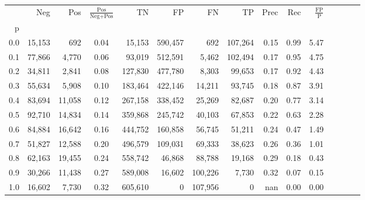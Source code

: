 \begin{tabular}{rrrcrrrrrrrrrrr}
\toprule
{} &     Neg &     Pos & $\frac{\text{Pos}}{\text{Neg}+\text{Pos}}$ &       TN &       FP &       FN &       TP &  Prec &   Rec & $\frac{\text{FP}}{\text{P}}$ \\
p   &         &         &                                            &          &          &          &          &       &       &                              \\
\midrule
0.0 &  15,153 &     692 &                                       0.04 &   15,153 &  590,457 &      692 &  107,264 &  0.15 &  0.99 &                         5.47 \\
0.1 &  77,866 &   4,770 &                                       0.06 &   93,019 &  512,591 &    5,462 &  102,494 &  0.17 &  0.95 &                         4.75 \\
0.2 &  34,811 &   2,841 &                                       0.08 &  127,830 &  477,780 &    8,303 &   99,653 &  0.17 &  0.92 &                         4.43 \\
0.3 &  55,634 &   5,908 &                                       0.10 &  183,464 &  422,146 &   14,211 &   93,745 &  0.18 &  0.87 &                         3.91 \\
0.4 &  83,694 &  11,058 &                                       0.12 &  267,158 &  338,452 &   25,269 &   82,687 &  0.20 &  0.77 &                         3.14 \\
0.5 &  92,710 &  14,834 &                                       0.14 &  359,868 &  245,742 &   40,103 &   67,853 &  0.22 &  0.63 &                         2.28 \\
0.6 &  84,884 &  16,642 &                                       0.16 &  444,752 &  160,858 &   56,745 &   51,211 &  0.24 &  0.47 &                         1.49 \\
0.7 &  51,827 &  12,588 &                                       0.20 &  496,579 &  109,031 &   69,333 &   38,623 &  0.26 &  0.36 &                         1.01 \\
0.8 &  62,163 &  19,455 &                                       0.24 &  558,742 &   46,868 &   88,788 &   19,168 &  0.29 &  0.18 &                         0.43 \\
0.9 &  30,266 &  11,438 &                                       0.27 &  589,008 &   16,602 &  100,226 &    7,730 &  0.32 &  0.07 &                         0.15 \\
1.0 &  16,602 &   7,730 &                                       0.32 &  605,610 &        0 &  107,956 &        0 &   nan &  0.00 &                         0.00 \\
\bottomrule
\end{tabular}
